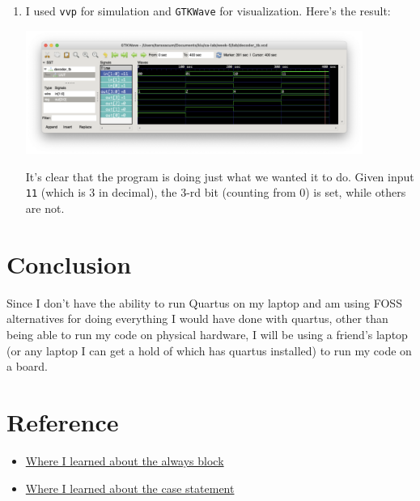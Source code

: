 \documentclass{article}
\begin{document}
\begin{enumerate}
{            This visualization was made using \verb|DigitalJS| plugin for VSCodium.
        }
        \item {
            I used \verb|vvp| for simulation and \verb|GTKWave| for visualization. Here's the result:

            \includegraphics[width=11cm]{diagram.png}

            It's clear that the program is doing just what we wanted it to do. Given input \verb|11| (which is \(3\) in decimal), the 3-rd bit (counting from \(0\)) is set, while others are not.
        }
    \end{enumerate}

    \section*{Conclusion}
    
    Since I don't have the ability to run Quartus on my laptop and am using FOSS alternatives for doing everything I would have done with quartus, other than being able to run my code on physical hardware, I will be using a friend's laptop (or any laptop I can get a hold of which has quartus installed) to run my code on a board.

    \section*{Reference}
    
    \begin{itemize}
        \item \href{https://www.chipverify.com/verilog/verilog-always-block}{Where I learned about the always block}
        \item \href{https://www.chipverify.com/verilog/verilog-case-statement}{Where I learned about the case statement}
    \end{itemize}
\end{document}
